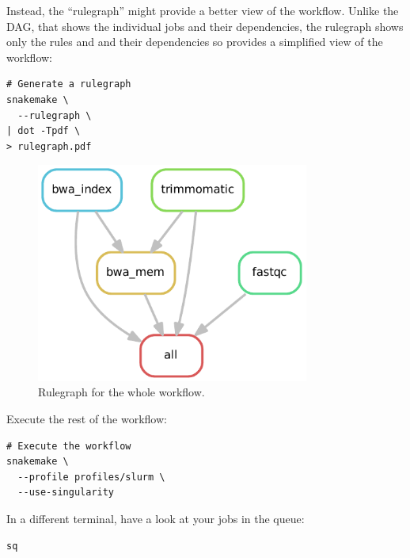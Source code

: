 Instead, the ``rulegraph'' might provide a better view of the workflow. Unlike the DAG, that shows the individual jobs and their
dependencies, the rulegraph shows only the rules and and their dependencies so provides a simplified view of the workflow:

\begin{lstlisting}
# Generate a rulegraph
snakemake \
  --rulegraph \
| dot -Tpdf \
> rulegraph.pdf
\end{lstlisting}

\begin{figure}[H]
\centering
\includegraphics[width=0.8\textwidth]{handout/rulegraph.pdf}
\caption{Rulegraph for the whole workflow.}
\label{fig:rulegraph}
\end{figure}

Execute the rest of the workflow:

\begin{lstlisting}
# Execute the workflow
snakemake \
  --profile profiles/slurm \
  --use-singularity
\end{lstlisting}

In a different terminal, have a look at your jobs in the queue:

\begin{lstlisting}
sq
\end{lstlisting}

